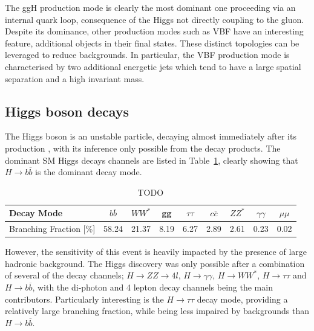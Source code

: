 The ggH production mode is clearly the most dominant one proceeding via an internal quark loop, consequence of the Higgs not directly coupling to the gluon. Despite its dominance, other production modes such as VBF have an interesting feature, additional objects in their final states. These distinct topologies can be leveraged to reduce backgrounds. In particular, the VBF production mode is characterised by two additional energetic jets which tend to have a large spatial separation and a high invariant mass.

\subsection{Higgs boson decays}

The Higgs boson is an unstable particle, decaying almost immediately after its production \cite{HiggsUnstable}, with its inference only possible from the decay products. The dominant SM Higgs decays channels are listed in Table~\ref{Table:Introduction_HiggsBranchingFractions}, clearly showing that $H\rightarrow b\overline{b}$ is the dominant decay mode. 

\begin{table}[h]
\begin{tabular}{l|c|c|c|c|c|c|c|c}
\hline
Decay Mode                  & $b\overline{b}$    & $WW^*$    & gg   & $\tau\tau$   & $c\overline{c}$   & $ZZ^*$      & $\gamma\gamma$ & $\mu\mu$ \\ \hline
Branching Fraction {[}\%{]} & 58.24 & 21.37 & 8.19 & 6.27 & 2.89 & 2.61 & 0.23                            & 0.02
\end{tabular}
\caption{TODO \cite{HiggsProduction_XS}}
\label{Table:Introduction_HiggsBranchingFractions}
\end{table}

However, the sensitivity of this event is heavily impacted by the presence of large hadronic background. The Higgs discovery was only possible after a combination of several of the decay channels; $H\rightarrow ZZ \rightarrow 4l$, $H\rightarrow \gamma \gamma$, $H\rightarrow WW^*$, $H\rightarrow \tau\tau$ and $H\rightarrow b\overline{b}$, with the di-photon and 4 lepton decay channels being the main contributors. Particularly interesting is the $H\rightarrow \tau\tau$ decay mode, providing a relatively large branching fraction, while being less impaired by backgrounds than $H\rightarrow b\overline{b}$.
